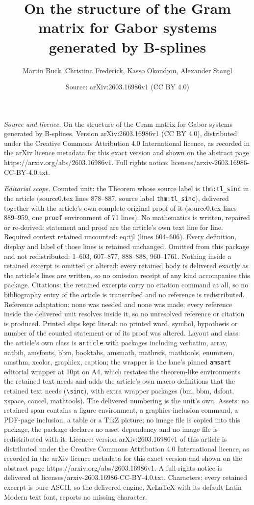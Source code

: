 \documentclass[10pt,a4paper]{amsart}
\title[On the structure of the Gram matrix for Gabor systems genera]{On the structure of the Gram matrix for Gabor systems generated by B-splines}
\author{Martin Buck, Christina Frederick, Kasso Okoudjou, Alexander Stangl}
\date{Source: arXiv:2603.16986v1 (CC BY 4.0)}
\begin{document}
\maketitle

\noindent\emph{Source and licence.} On the structure of the Gram matrix for Gabor systems generated by B-splines. Version arXiv:2603.16986v1 (CC BY 4.0), distributed under the Creative Commons Attribution 4.0 International licence, as recorded in the arXiv licence metadata for this exact version and shown on the abstract page https://arxiv.org/abs/2603.16986v1. Full rights notice: licenses/arxiv-2603.16986-CC-BY-4.0.txt.\par\smallskip

\noindent\textit{Editorial scope.} Counted unit: the Theorem whose source label is \texttt{thm:tl\_sinc} in the article (source0.tex lines 878--887, source label \texttt{thm:tl\_sinc}), delivered together with the article's own complete original proof of it (source0.tex lines 889--959, one \texttt{proof} environment of 71 lines). No mathematics is written, repaired or re-derived: statement and proof are the article's own text line for line. Required context retained uncounted: eq:tjl (lines 604--606). Every definition, display and label of those lines is retained unchanged. Omitted from this package and not redistributed: 1--603, 607--877, 888--888, 960--1761. Nothing inside a retained excerpt is omitted or altered: every retained body is delivered exactly as the article's lines are written, so no omission receipt of any kind accompanies this package. Citations: the retained excerpts carry no citation command at all, so no bibliography entry of the article is transcribed and no reference is redistributed. Reference adaptation: none was needed and none was made; every reference inside the delivered unit resolves inside it, so no unresolved reference or citation is produced. Printed slips kept literal: no printed word, symbol, hypothesis or number of the counted statement or of its proof was altered. Layout and class: the article's own class is \texttt{article} with packages including verbatim, array, natbib, amsfonts, bbm, booktabs, amsmath, mathrsfs, mathtools, enumitem, amsthm, xcolor, graphicx, caption; the wrapper is the lane's pinned \texttt{amsart} editorial wrapper at 10pt on A4, which restates the theorem-like environments the retained text needs and adds the article's own macro definitions that the retained text needs (\texttt{\textbackslash sinc}), with extra wrapper packages (bm, bbm, dsfont, xspace, cancel, mathtools). The delivered numbering is the unit's own. Assets: no retained span contains a figure environment, a graphics-inclusion command, a PDF-page inclusion, a table or a TikZ picture; no image file is copied into this package, the package declares no asset dependency and no image file is redistributed with it. Licence: version arXiv:2603.16986v1 of this article is distributed under the Creative Commons Attribution 4.0 International licence, as recorded in the arXiv licence metadata for this exact version and shown on the abstract page https://arxiv.org/abs/2603.16986v1. A full rights notice is delivered at licenses/arxiv-2603.16986-CC-BY-4.0.txt. Characters: every retained excerpt is pure ASCII, so the delivered engine, XeLaTeX with its default Latin Modern text font, reports no missing character.
\end{document}
